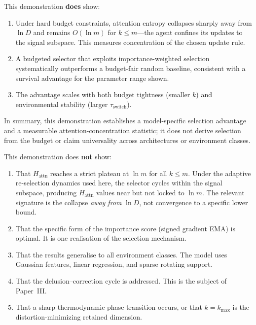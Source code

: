 \documentclass[12pt,a4paper,openany]{book}
\begin{document}
\medskip
This demonstration \textbf{does} show:
\begin{enumerate}
\item Under hard budget constraints, attention entropy
  collapses sharply away from $\ln D$ and remains
  $O(\ln m)$ for $k \leq m$---the agent confines its
  updates to the signal subspace.
  This measures concentration of the chosen update rule.
\item A budgeted selector that exploits importance-weighted
  selection systematically outperforms a budget-fair
  random baseline, consistent with a survival advantage
  for the parameter range shown.
\item The advantage scales with both budget tightness
  (smaller $k$) and environmental stability (larger
  $\tau_{\mathrm{switch}}$).
\end{enumerate}

\noindent
In summary, this demonstration establishes a model-specific selection
advantage and a measurable attention-concentration statistic; it does
not derive selection from the budget or claim universality across
architectures or environment classes.

\medskip
This demonstration does \textbf{not} show:
\begin{enumerate}
\item That $H_{\mathrm{attn}}$ reaches a strict plateau
  at $\ln m$ for all $k \leq m$.  Under the adaptive
  re-selection dynamics used here, the selector cycles
  within the signal subspace, producing
  $H_{\mathrm{attn}}$ values near but not locked to
  $\ln m$.  The relevant signature is the collapse
  \emph{away from} $\ln D$, not convergence to a
  specific lower bound.
\item That the specific form of the importance score
  (signed gradient EMA) is optimal.  It is one
  realisation of the selection mechanism.
\item That the results generalise to all environment
  classes.  The model uses Gaussian features, linear
  regression, and sparse rotating support.
\item That the delusion--correction cycle is addressed.
  This is the subject of Paper~III.
\item That a sharp thermodynamic phase transition occurs, or that
  $k=k_{\max}$ is the distortion-minimizing retained dimension.
\end{enumerate}
\end{document}
